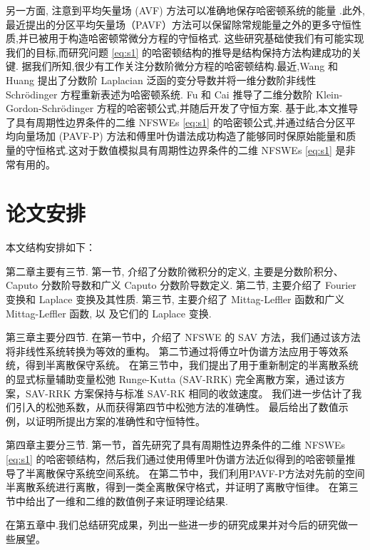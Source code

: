 另一方面, 注意到平均矢量场 (AVF) 方法可以准确地保存哈密顿系统的能量 \cite{buddGeometricIntegrationUsing1999,quispelNewClassEnergypreserving2008}.此外,最近提出的分区平均矢量场（PAVF）方法可以保留除常规能量之外的更多守恒性质,并已被用于构造哈密顿常微分方程的守恒格式\cite{caiPartitionedAveragedVector2018}.
这些研究基础使我们有可能实现我们的目标,而研究问题 \eqref{eq:s1} 的哈密顿结构的推导是结构保持方法构建成功的关键.
据我们所知,很少有工作关注分数阶微分方程的哈密顿结构.最近,Wang 和 Huang \cite{wangStructurepreservingNumericalMethods2018} 提出了分数阶 Laplacian 泛函的变分导数并将一维分数阶非线性 Schr{\"o}dinger 方程重新表述为哈密顿系统. 
Fu 和 Cai \cite{fuStructurepreservingAlgorithmsTwodimensional2020} 推导了二维分数阶 Klein-Gordon-Schr{\"o}dinger 方程的哈密顿公式,并随后开发了守恒方案.
基于此,本文推导了具有周期性边界条件的二维 NFSWEs \eqref{eq:s1} 的哈密顿公式,并通过结合分区平均向量场加 (PAVF-P) 方法和傅里叶伪谱法成功构造了能够同时保原始能量和质量的守恒格式.这对于数值模拟具有周期性边界条件的二维 NFSWEs \eqref{eq:s1} 是非常有用的。

\section{论文安排}
本文结构安排如下：

第二章主要有三节. 第一节, 介绍了分数阶微积分的定义, 主要是分数阶积分、Caputo 分数阶导数和广义 Caputo 分数阶导数定义. 第二节, 主要介绍了 Fourier 变换和 Laplace 变换及其性质. 
第三节, 主要介绍了 Mittag-Leffler 函数和广义 Mittag-Leffler 函数, 以 及它们的 Laplace 变换.

第三章主要分四节. 在第一节中，介绍了 NFSWE 的 SAV 方法，我们通过该方法将非线性系统转换为等效的重构。
第二节通过将傅立叶伪谱方法应用于等效系统，得到半离散保守系统。
在第三节中，我们提出了用于重新制定的半离散系统的显式标量辅助变量松弛 Runge-Kutta (SAV-RRK) 完全离散方案，通过该方案，SAV-RRK 方案保持与标准 SAV-RK 相同的收敛速度。
我们进一步估计了我们引入的松弛系数，从而获得第四节中松弛方法的准确性。
最后给出了数值示例，以证明所提出方案的准确性和守恒特性。

第四章主要分三节. 第一节，首先研究了具有周期性边界条件的二维 NFSWEs \eqref{eq:s1} 的哈密顿结构，然后我们通过使用傅里叶伪谱方法近似得到的哈密顿量推导了半离散保守系统空间系统。
在第二节中，我们利用PAVF-P方法对先前的空间半离散系统进行离散，得到一类全离散保守格式，并证明了离散守恒律。
在第三节中给出了一维和二维的数值例子来证明理论结果.

在第五章中.我们总结研究成果，列出一些进一步的研究成果并对今后的研究做一些展望。